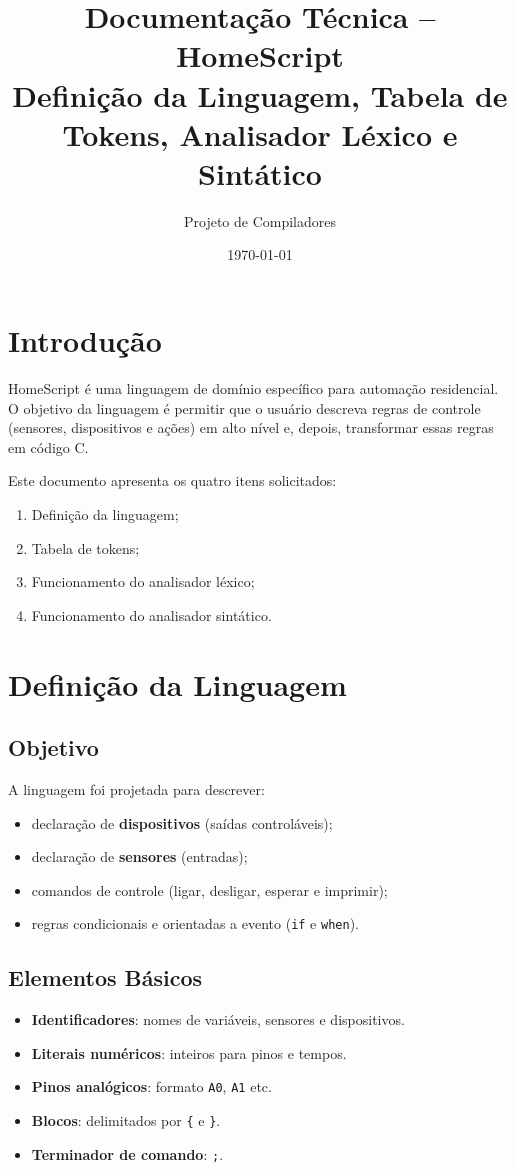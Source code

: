 \documentclass[12pt,a4paper]{article}
\title{Documentação Técnica -- HomeScript\\\large Definição da Linguagem, Tabela de Tokens, Analisador Léxico e Sintático}
\author{Projeto de Compiladores}
\date{\today}
\begin{document}
\maketitle
\tableofcontents
\newpage

\section{Introdução}
HomeScript é uma linguagem de domínio específico para automação residencial. O objetivo da linguagem é permitir que o usuário descreva regras de controle (sensores, dispositivos e ações) em alto nível e, depois, transformar essas regras em código C.

Este documento apresenta os quatro itens solicitados:
\begin{enumerate}[label=\arabic*.]
  \item Definição da linguagem;
  \item Tabela de tokens;
  \item Funcionamento do analisador léxico;
  \item Funcionamento do analisador sintático.
\end{enumerate}

\section{Definição da Linguagem}

\subsection{Objetivo}
A linguagem foi projetada para descrever:
\begin{itemize}
  \item declaração de \textbf{dispositivos} (saídas controláveis);
  \item declaração de \textbf{sensores} (entradas);
  \item comandos de controle (ligar, desligar, esperar e imprimir);
  \item regras condicionais e orientadas a evento (\texttt{if} e \texttt{when}).
\end{itemize}

\subsection{Elementos Básicos}
\begin{itemize}
  \item \textbf{Identificadores}: nomes de variáveis, sensores e dispositivos.
  \item \textbf{Literais numéricos}: inteiros para pinos e tempos.
  \item \textbf{Pinos analógicos}: formato \texttt{A0}, \texttt{A1} etc.
  \item \textbf{Blocos}: delimitados por \texttt{\{} e \texttt{\}}.
  \item \textbf{Terminador de comando}: \texttt{;}.
\end{itemize}
\end{document}
